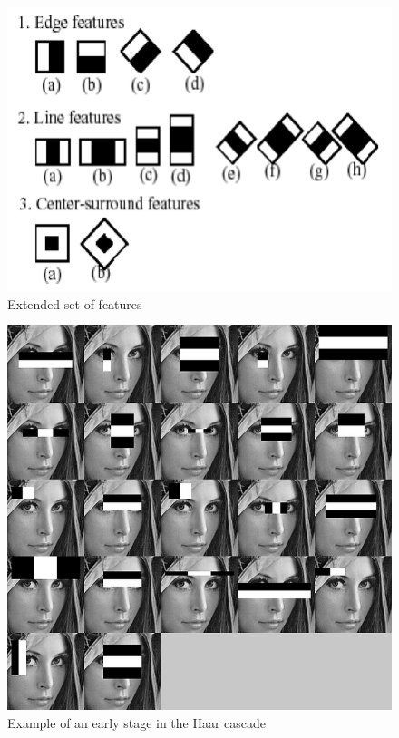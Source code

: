 \begin{figure}[!h]
\begin{center}
\noindent \includegraphics[scale=0.6]{figures/haar_features_extended} 
\newline
\caption{Extended set of features \cite{DIN08}}
\label{haar_features_extended}
\end{center} 
\end{figure}

\begin{figure}[!h]
\begin{center}
\noindent \includegraphics[scale=0.5]{figures/haar_features_early_stage} 
\newline
\caption{Example of an early stage in the Haar cascade \cite{HAR12}}
\label{haar_features_early_stage}
\end{center} 
\end{figure}

